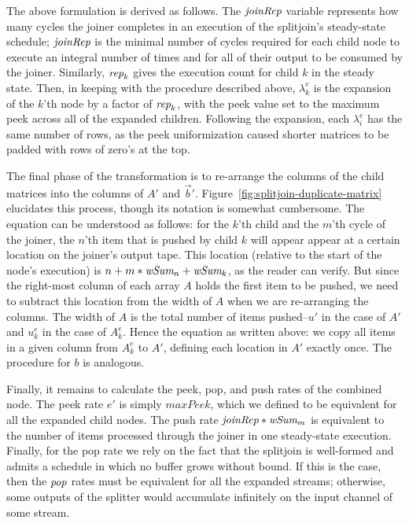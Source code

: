 The above formulation is derived as follows.  The $\mbox{\it joinRep}$
variable represents how many cycles the joiner completes in an
execution of the splitjoin's steady-state schedule; $\mbox{\it joinRep}$ is
the minimal number of cycles required for each child node to execute
an integral number of times and for all of their output to be consumed
by the joiner.  Similarly, $\mbox{\it rep}_k$ gives the execution count for
child $k$ in the steady state.  Then, in keeping with the procedure
described above, $\lambda_k^e$ is the expansion of the $k$'th node by
a factor of $\mbox{\it rep}_k$, with the peek value set to the maximum peek
across all of the expanded children.  Following the expansion, each
$\lambda_i^e$ has the same number of rows, as the peek uniformization
caused shorter matrices to be padded with rows of zero's at the top.

The final phase of the transformation is to re-arrange the columns of
the child matrices into the columns of $A'$ and ${\vec b}'$.
Figure~\ref{fig:splitjoin-duplicate-matrix} elucidates this process,
though its notation is somewhat cumbersome.  The equation can be
understood as follows: for the $k$'th child and the $m$'th cycle of
the joiner, the $n$'th item that is pushed by child $k$ will appear
appear at a certain location on the joiner's output tape.  This
location (relative to the start of the node's execution) is $n + m *
\mbox{\it wSum}_n + \mbox{\it wSum}_k$, as the reader can verify.  But since the
right-most column of each array $A$ holds the first item to be pushed,
we need to subtract this location from the width of $A$ when we are
re-arranging the columns.  The width of $A$ is the total number of
items pushed--$u'$ in the case of $A'$ and $u_k^e$ in the case of
$A_k^e$.  Hence the equation as written above: we copy all items in a
given column from $A_k^e$ to $A'$, defining each location in $A'$
exactly once.  The procedure for $b$ is analogous.

Finally, it remains to calculate the peek, pop, and push rates of the
combined node.  The peek rate $e'$ is simply $maxPeek$, which we
defined to be equivalent for all the expanded child nodes.  The push
rate $\mbox{\it joinRep}*\mbox{\it wSum}_m$ is equivalent to the number of items
processed through the joiner in one steady-state execution.  Finally,
for the pop rate we rely on the fact that the splitjoin is well-formed
and admits a schedule in which no buffer grows without bound.  If this
is the case, then the $\mbox{\it pop}$ rates must be equivalent for all the
expanded streams; otherwise, some outputs of the splitter would
accumulate infinitely on the input channel of some stream.  

